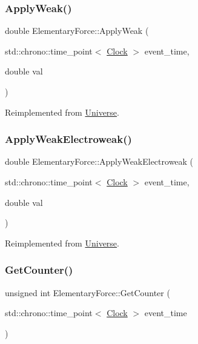 \subsubsection{\texorpdfstring{Apply\+Weak()}{ApplyWeak()}}
{\footnotesize\ttfamily double Elementary\+Force\+::\+Apply\+Weak (\begin{DoxyParamCaption}\item[{std\+::chrono\+::time\+\_\+point$<$ \mbox{\hyperlink{universe_8h_a0ef8d951d1ca5ab3cfaf7ab4c7a6fd80}{Clock}} $>$}]{event\+\_\+time,  }\item[{double}]{val }\end{DoxyParamCaption})\hspace{0.3cm}{\ttfamily [virtual]}}



Reimplemented from \mbox{\hyperlink{classUniverse_a6d1226b3adec3c42a833afdbb6a65a92}{Universe}}.

\mbox{\label{classElementaryForce_a2d3a5444c771f35d66d4151c62f53b12}} 
\subsubsection{\texorpdfstring{Apply\+Weak\+Electroweak()}{ApplyWeakElectroweak()}}
{\footnotesize\ttfamily double Elementary\+Force\+::\+Apply\+Weak\+Electroweak (\begin{DoxyParamCaption}\item[{std\+::chrono\+::time\+\_\+point$<$ \mbox{\hyperlink{universe_8h_a0ef8d951d1ca5ab3cfaf7ab4c7a6fd80}{Clock}} $>$}]{event\+\_\+time,  }\item[{double}]{val }\end{DoxyParamCaption})\hspace{0.3cm}{\ttfamily [virtual]}}



Reimplemented from \mbox{\hyperlink{classUniverse_a46a906baabb63e5d31f8b48ea1fae52e}{Universe}}.

\mbox{\label{classElementaryForce_a466c37c769c1826bd0f416f38bb09996}} 
\subsubsection{\texorpdfstring{Get\+Counter()}{GetCounter()}}
{\footnotesize\ttfamily unsigned int Elementary\+Force\+::\+Get\+Counter (\begin{DoxyParamCaption}\item[{std\+::chrono\+::time\+\_\+point$<$ \mbox{\hyperlink{universe_8h_a0ef8d951d1ca5ab3cfaf7ab4c7a6fd80}{Clock}} $>$}]{event\+\_\+time }\end{DoxyParamCaption})}

